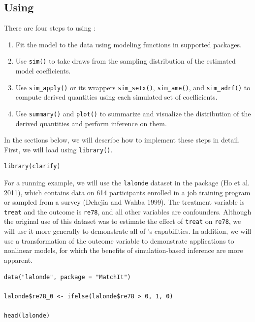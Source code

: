 \hypertarget{using}{%
\subsection{\texorpdfstring{Using }{Using }}\label{using}}

There are four steps to using :

\begin{enumerate}
\def\labelenumi{\arabic{enumi}.}
\item
  Fit the model to the data using modeling functions in supported packages.
\item
  Use \texttt{sim()} to take draws from the sampling distribution of the estimated model coefficients.
\item
  Use \texttt{sim\_apply()} or its wrappers \texttt{sim\_setx()}, \texttt{sim\_ame()}, and \texttt{sim\_adrf()} to compute derived quantities using each simulated set of coefficients.
\item
  Use \texttt{summary()} and \texttt{plot()} to summarize and visualize the distribution of the derived quantities and perform inference on them.
\end{enumerate}

In the sections below, we will describe how to implement these steps in detail. First, we will load  using \texttt{library()}.

\begin{verbatim}
library(clarify)
\end{verbatim}

For a running example, we will use the \texttt{lalonde} dataset in the  package (Ho et al. 2011), which contains data on 614 participants enrolled in a job training program or sampled from a survey (Dehejia and Wahba 1999). The treatment variable is \texttt{treat} and the outcome is \texttt{re78}, and all other variables are confounders. Although the original use of this dataset was to estimate the effect of \texttt{treat} on \texttt{re78}, we will use it more generally to demonstrate all of 's capabilities. In addition, we will use a transformation of the outcome variable to demonstrate applications to nonlinear models, for which the benefits of simulation-based inference are more apparent.

\begin{verbatim}
data("lalonde", package = "MatchIt")

lalonde$re78_0 <- ifelse(lalonde$re78 > 0, 1, 0)

head(lalonde)
\end{verbatim}

